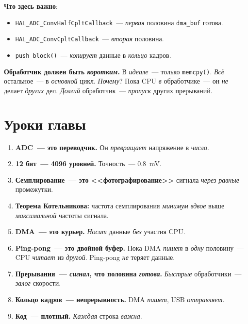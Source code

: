 \textbf{Что здесь важно}:
\begin{itemize}
    \item \texttt{HAL\_ADC\_ConvHalfCpltCallback}~--- \emph{первая}
          половина \texttt{dma\_buf} готова.
    \item \texttt{HAL\_ADC\_ConvCpltCallback}~--- \emph{вторая}
          половина.
    \item \texttt{push\_block()}~--- \emph{копирует}
          данные в \emph{кольцо} кадров.
\end{itemize}

\begin{warnbox}
\textbf{Обработчик должен быть \emph{коротким}.} В
\emph{идеале}~--- только \texttt{memcpy()}. \emph{Всё}
остальное~--- в \emph{основной} цикл. \emph{Почему}?
Пока CPU \emph{в} обработчике~--- он \emph{не} делает
\emph{других} дел. \emph{Долгий} обработчик~---
\emph{пропуск} других прерываний.
\end{warnbox}

\section{Уроки главы}
\label{sec:adc-lessons}

\begin{enumerate}
    \item \textbf{ADC~--- это переводчик.} Он \emph{превращает}
          напряжение в \emph{число}.
    \item \textbf{12 бит~--- 4096 уровней.} Точность~---
          \SI{0.8}{\milli\volt}.
    \item \textbf{Семплирование~--- это <<фотографирование>>}
          сигнала \emph{через} \emph{равные} промежутки.
    \item \textbf{Теорема Котельникова:} частота семплирования
          \emph{минимум} \emph{вдвое} выше \emph{максимальной}
          частоты сигнала.
    \item \textbf{DMA~--- это курьер.} \emph{Носит} данные
          \emph{без} участия CPU.
    \item \textbf{Ping-pong~--- это двойной буфер.} Пока DMA
          \emph{пишет} в \emph{одну} половину~--- CPU \emph{читает} из \emph{другой}. Ping-pong \emph{не} теряет данные.
    \item \textbf{Прерывания~--- \emph{сигнал}, что половина
      \emph{готова}.} \emph{Быстрые}
          обработчики~--- \emph{залог} скорости.
    \item \textbf{Кольцо кадров~--- непрерывность.} DMA
          \emph{пишет}, USB \emph{отправляет}.
    \item \textbf{Код~--- плотный.} \emph{Каждая} строка
          \emph{важна}.
\end{enumerate}


